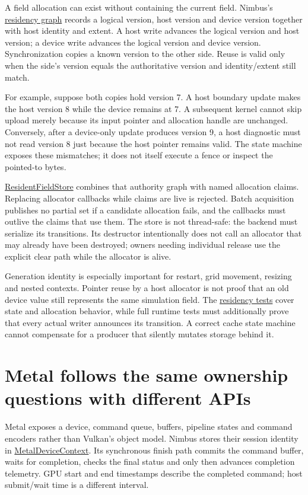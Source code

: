 A field allocation can exist without containing the current field. Nimbus's
\href{../include/compute/compute_residency.hpp}{residency graph} records a
logical version, host version and device version together with host identity
and extent. A host write advances the logical version and host version; a
device write advances the logical version and device version. Synchronization
copies a known version to the other side. Reuse is valid only when the side's
version equals the authoritative version and identity/extent still match.

For example, suppose both copies hold version 7. A host boundary update makes
the host version 8 while the device remains at 7. A subsequent kernel cannot
skip upload merely because its input pointer and allocation handle are
unchanged. Conversely, after a device-only update produces version 9, a host
diagnostic must not read version 8 just because the host pointer remains valid.
The state machine exposes these mismatches; it does not itself execute a fence
or inspect the pointed-to bytes.

\href{../include/compute/resident_field_store.hpp}{ResidentFieldStore}
combines that authority graph with named allocation claims. Replacing allocator
callbacks while claims are live is rejected. Batch acquisition publishes no
partial set if a candidate allocation fails, and the callbacks must outlive
the claims that use them. The store is not thread-safe: the backend must
serialize its transitions. Its destructor intentionally does not call an
allocator that may already have been destroyed; owners needing individual
release use the explicit clear path while the allocator is alive.

Generation identity is especially important for restart, grid movement,
resizing and nested contexts. Pointer reuse by a host allocator is not proof
that an old device value still represents the same simulation field. The
\href{../tests/compute/test_residency.cpp}{residency tests} cover state and
allocation behavior, while full runtime tests must additionally prove that
every actual writer announces its transition. A correct cache state machine
cannot compensate for a producer that silently mutates storage behind it.

\section{Metal follows the same ownership questions with different APIs}

Metal exposes a device, command queue, buffers, pipeline states and command
encoders rather than Vulkan's object model. Nimbus stores their session
identity in
\href{../metal/src/compute/internal/metal_device_context.hpp}{MetalDeviceContext}.
Its synchronous finish path commits the command buffer, waits for completion,
checks the final status and only then advances completion telemetry. GPU start
and end timestamps describe the completed command; host submit/wait time is
a different interval.

